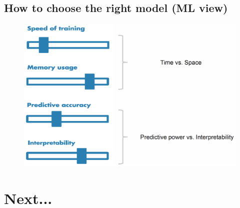 \documentclass[a4paper]{article}
\begin{document}
		\subsection{How to choose the right model (ML view)}
		
		\begin{figure}[htb!]
			\centering
			\includegraphics[width=\textwidth]{img/sw09/right_model.png}
		\end{figure}
	
	\newpage
	
	\section{Next...}
				
\end{document}
